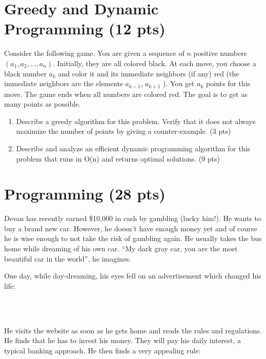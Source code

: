 \documentclass{article}
\begin{document}
\section{Greedy and Dynamic Programming (12 pts)}
Consider the following game. You are given a sequence of $n$ positive numbers
$(a_1, a_2, ..., a_n)$. Initially, they are all colored black. At each move,
you choose a black number $a_k$ and color it and its immediate neighbors (if
any) red (the immediate neighbors are the elements $a_{k-1}$, $a_{k+1}$ ). You
get $a_k$ points for this move. The game ends when all numbers are colored
red. The goal is to get as many points as possible.

\begin{enumerate}[label=(\alph*)]

\item Describe a greedy algorithm for this problem. Verify that it does not always maximize the number of points by giving a counter-example. (3 pts)

\item Describe and analyze an efficient dynamic programming algorithm for this problem that runs in O(n) and returns optimal solutions. (9 pts)

\end{enumerate}



\section{Programming (28 pts)}
Devan has recently earned \$10,000 in cash by gambling (lucky him!). He
wants to buy a brand new car. However, he doesn't have enough money yet and
of course he is wise enough to not take the risk of gambling again. He
usually takes the bus home while dreaming of his own car. ``My dark gray car,
you are the most beautiful car in the world'', he imagines.

One day, while day-dreaming, his eyes fell on an advertisement which changed
his life:

\begin{center}
 \\
 \\
\end{center}

He visits the website as soon as he gets home and reads the rules and
regulations. He finds that he has to invest his money. They will pay his
daily interest, a typical banking approach. He then finds a very appealing
rule:
\end{document}
